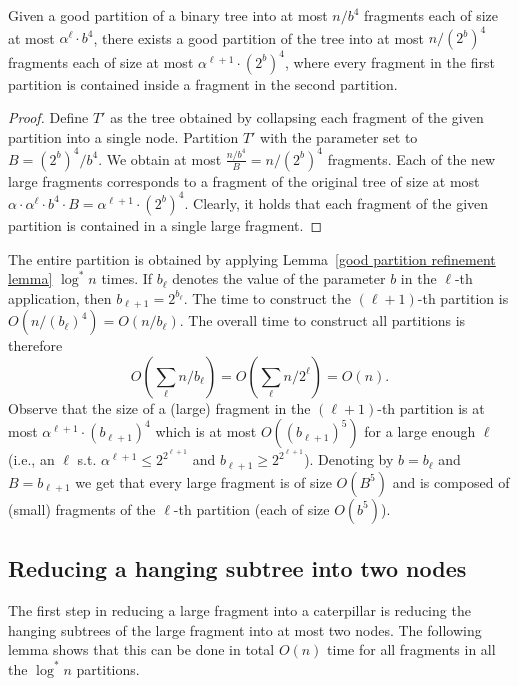 \documentclass[a4paper,UKenglish]{lipics-v2016}
\theoremstyle{plain}
\begin{document}
\begin{lemma}\label{good partition refinement lemma}
Given a good partition of a binary tree into at most $n/b^{4}$ fragments each of size at most $\alpha^{\ell}\cdot b^{4}$, there
exists a good partition of the tree into at most $n/(2^b)^{4}$ fragments each of size at most $\alpha^{\ell+1}\cdot (2^{b})^{4}$,
where every fragment in the first partition is contained inside a fragment in the second partition.
\end{lemma}
\begin{proof}
Define $T'$ as the tree obtained by collapsing each fragment of the given partition into a single node. Partition $T'$ with the parameter set to $B= {(2^{b})^{4}}/{b^{4}}$. We obtain at most $\frac{n/b^4}{B}=n/(2^{b})^{4}$ fragments. Each of the new large fragments corresponds to a fragment of the original tree of size at most $\alpha\cdot \alpha^{\ell}\cdot b^{4}\cdot B = \alpha^{\ell+1}\cdot (2^{b})^{4}$. Clearly, it holds that each fragment of the given partition is contained in a single large fragment.
\end{proof}

\noindent The entire partition is obtained by applying Lemma~\ref{good partition refinement lemma} $\log^{*}n$ times. 
If $b_{\ell}$ denotes the value of the parameter $b$ in the $\ell$-th application, then  $b_{\ell+1}=2^{b_{\ell}}$. The time to construct the $(\ell+1)$-th partition is $O(n/(b_{\ell})^{4})=O(n/b_{\ell})$. The overall time to construct all partitions is therefore 
$$ O(\sum_{\ell} {n}/{b_{\ell}}) = O(\sum_{\ell} {n}/{2^{\ell}}) = O(n).$$
Observe that the size of a (large) fragment in the $(\ell+1)$-th partition is at most $\alpha^{\ell+1} \cdot (b_{\ell+1})^{4}$ which is at most $O((b_{\ell+1})^5)$ for a large enough $\ell$ (i.e., an $\ell$ s.t. $\alpha^{\ell+1}\leq 2^{2^{\ell+1}}$ and $b_{\ell+1}\geq 2^{2^{\ell+1}}$).  Denoting by $b=b_{\ell}$ and $B=b_{\ell+1}$  we get that every large fragment is of size $O(B^5)$ and is composed of (small) fragments of the $\ell$-th partition (each of size $O(b^5)$). 








\subsection{Reducing a hanging subtree into two nodes}\label{section:lemma1}
The first step in reducing a large fragment into a caterpillar is reducing the hanging subtrees of the large fragment into at most two nodes. The following lemma shows that this can be done in total $O(n)$ time for all fragments in all the $\log^* n$ partitions.
\end{document}
